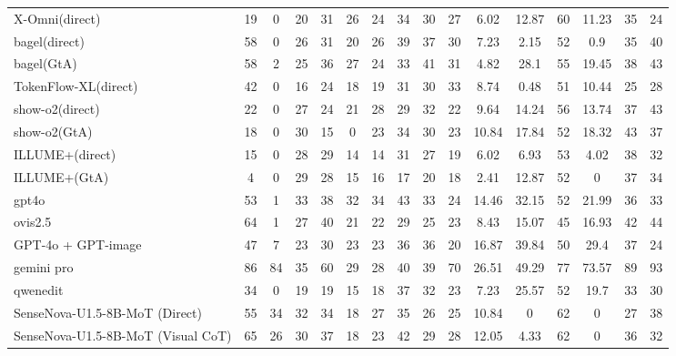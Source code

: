 \documentclass{article}
\providecommand{\rowcolor}[1]{}
\theoremstyle{plain}
\theoremstyle{definition}
\theoremstyle{remark}
\begin{document}
\begin{table}[!htbp]
{\begin{tabular}{@{}lccccccccccccccc@{}}
X-Omni(direct) & 19 & 0 & 20 & 31 & 26 & 24 & 34 & 30 & 27 & 6.02 & 12.87 & 60 & 11.23 & 35 & 24 \\
bagel(direct) & 58 & 0 & 26 & 31 & 20 & 26 & 39 & 37 & 30 & 7.23 & 2.15 & 52 & 0.9 & 35 & 40 \\
bagel(GtA) & 58 & 2 & 25 & 36 & 27 & 24 & 33 & 41 & 31 & 4.82 & 28.1 & 55 & 19.45 & 38 & 43 \\
TokenFlow-XL(direct) & 42 & 0 & 16 & 24 & 18 & 19 & 31 & 30 & 33 & 8.74 & 0.48 & 51 & 10.44 & 25 & 28 \\
show-o2(direct) & 22 & 0 & 27 & 24 & 21 & 28 & 29 & 32 & 22 & 9.64 & 14.24 & 56 & 13.74 & 37 & 43 \\
show-o2(GtA) & 18 & 0 & 30 & 15 & 0 & 23 & 34 & 30 & 23 & 10.84 & 17.84 & 52 & 18.32 & 43 & 37 \\
ILLUME+(direct) & 15 & 0 & 28 & 29 & 14 & 14 & 31 & 27 & 19 & 6.02 & 6.93 & 53 & 4.02 & 38 & 32 \\
ILLUME+(GtA) & 4 & 0 & 29 & 28 & 15 & 16 & 17 & 20 & 18 & 2.41 & 12.87 & 52 & 0 & 37 & 34 \\
\midrule
\rowcolor{orange!8}
gpt4o & 53 & 1 & 33 & 38 & 32 & 34 & 43 & 33 & 24 & 14.46 & 32.15 & 52 & 21.99 & 36 & 33 \\
ovis2.5 & 64 & 1 & 27 & 40 & 21 & 22 & 29 & 25 & 23 & 8.43 & 15.07 & 45 & 16.93 & 42 & 44 \\
\midrule
GPT-4o + GPT-image & 47 & 7 & 23 & 30 & 23 & 23 & 36 & 36 & 20 & 16.87 & 39.84 & 50 & 29.4 & 37 & 24 \\
gemini pro & 86 & 84 & 35 & 60 & 29 & 28 & 40 & 39 & 70 & 26.51 & 49.29 & 77 & 73.57 & 89 & 93 \\
qwenedit & 34 & 0 & 19 & 19 & 15 & 18 & 37 & 32 & 23 & 7.23 & 25.57 & 52 & 19.7 & 33 & 30 \\
\midrule
SenseNova-U1.5-8B-MoT (Direct) & 55 & 34 & 32 & 34 & 18 & 27 & 35 & 26 & 25 & 10.84 & 0 & 62 & 0 & 27 & 38 \\
SenseNova-U1.5-8B-MoT (Visual CoT) & 65 & 26 & 30 & 37 & 18 & 23 & 42 & 29 & 28 & 12.05 & 4.33 & 62 & 0 & 36 & 32 \\
\bottomrule
\end{tabular}%
}
\end{table}
\end{document}
